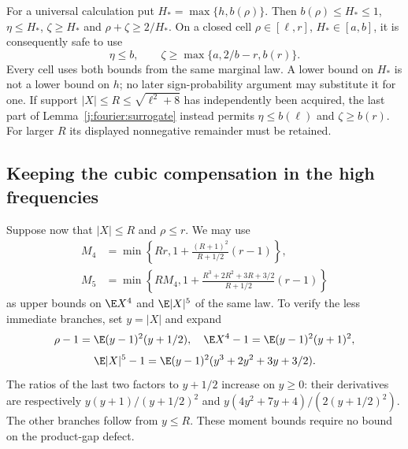 For a universal calculation put $H_* =\max\{h,b(\rho)\}$.
Then $b(\rho)\le H_*\le1$, $\eta\le H_*$, $\zeta\ge H_*$ and
$\rho+\zeta\ge2/H_*$. On a closed cell
$\rho\in[\ell,r]$, $H_*\in[a,b]$, it is consequently safe to use
\[
 \eta\le b,\qquad
 \zeta\ge\max\{a,2/b-r,b(r)\}.
\]
Every cell uses both bounds from the same marginal law. A lower bound on
$H_*$ is not a lower bound on $h$; no later sign-probability argument may
substitute it for one. If support $|X|\le R\le\sqrt{\ell^2+8}$ has independently been acquired,
the last part of Lemma~\ref{j:fourier:surrogate} instead permits
$\eta\le b(\ell)$ and $\zeta\ge b(r)$. For larger $R$ its displayed
nonnegative remainder must be retained.

\subsection{Keeping the cubic compensation in the high frequencies}
\label{j:fourier:compensated}
Suppose now that $|X|\le R$ and $\rho\le r$. We may use
\begin{align*}
 M_4&=\min\left\{Rr,1+\frac{(R+1)^2}{R+1/2}(r-1)\right\},\\
 M_5&=\min\left\{RM_4,
 1+\frac{R^3+2R^2+3R+3/2}{R+1/2}(r-1)\right\}
\end{align*}
as upper bounds on $\E X^4$ and $\E|X|^5$ of the same law. To verify the
less immediate branches, set $y=|X|$ and expand
\[
 \rho-1=\E(y-1)^2(y+1/2),\quad
 \E X^4-1=\E(y-1)^2(y+1)^2,
\]
\[
 \E|X|^5-1=\E(y-1)^2(y^3+2y^2+3y+3/2).
\]
The ratios of the last two factors to $y+1/2$ increase on $y\ge0$:
their derivatives are respectively
$y(y+1)/(y+1/2)^2$ and $y(4y^2+7y+4)/(2(y+1/2)^2)$.
The other branches follow from $y\le R$. These moment bounds require
no bound on the product-gap defect.

